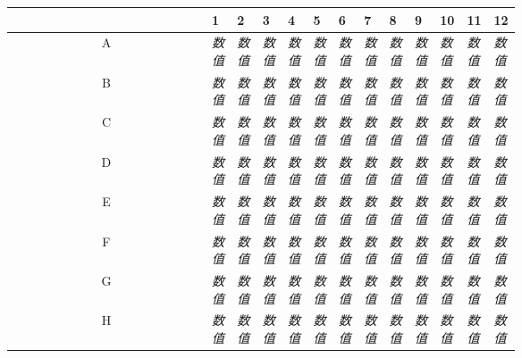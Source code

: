 \documentclass[UTF8,10pt,a4paper,fontset=fandol]{ctexart}
\begin{document}
\small
\begin{center}
\begin{tabular}{|c|*{12}{p{0.055\linewidth}|}}
\hline
 & 1 & 2 & 3 & 4 & 5 & 6 & 7 & 8 & 9 & 10 & 11 & 12\\
\hline
A &
\centering\textit{数值} &
\centering\textit{数值} &
\centering\textit{数值} &
\centering\textit{数值} &
\centering\textit{数值} &
\centering\textit{数值} &
\centering\textit{数值} &
\centering\textit{数值} &
\centering\textit{数值} &
\centering\textit{数值} &
\centering\textit{数值} &
\centering\textit{数值}\\
\hline
B &
\centering\textit{数值} &
\centering\textit{数值} &
\centering\textit{数值} &
\centering\textit{数值} &
\centering\textit{数值} &
\centering\textit{数值} &
\centering\textit{数值} &
\centering\textit{数值} &
\centering\textit{数值} &
\centering\textit{数值} &
\centering\textit{数值} &
\centering\textit{数值}\\
\hline
C &
\centering\textit{数值} &
\centering\textit{数值} &
\centering\textit{数值} &
\centering\textit{数值} &
\centering\textit{数值} &
\centering\textit{数值} &
\centering\textit{数值} &
\centering\textit{数值} &
\centering\textit{数值} &
\centering\textit{数值} &
\centering\textit{数值} &
\centering\textit{数值}\\
\hline
D &
\centering\textit{数值} &
\centering\textit{数值} &
\centering\textit{数值} &
\centering\textit{数值} &
\centering\textit{数值} &
\centering\textit{数值} &
\centering\textit{数值} &
\centering\textit{数值} &
\centering\textit{数值} &
\centering\textit{数值} &
\centering\textit{数值} &
\centering\textit{数值}\\
\hline
E &
\centering\textit{数值} &
\centering\textit{数值} &
\centering\textit{数值} &
\centering\textit{数值} &
\centering\textit{数值} &
\centering\textit{数值} &
\centering\textit{数值} &
\centering\textit{数值} &
\centering\textit{数值} &
\centering\textit{数值} &
\centering\textit{数值} &
\centering\textit{数值}\\
\hline
F &
\centering\textit{数值} &
\centering\textit{数值} &
\centering\textit{数值} &
\centering\textit{数值} &
\centering\textit{数值} &
\centering\textit{数值} &
\centering\textit{数值} &
\centering\textit{数值} &
\centering\textit{数值} &
\centering\textit{数值} &
\centering\textit{数值} &
\centering\textit{数值}\\
\hline
G &
\centering\textit{数值} &
\centering\textit{数值} &
\centering\textit{数值} &
\centering\textit{数值} &
\centering\textit{数值} &
\centering\textit{数值} &
\centering\textit{数值} &
\centering\textit{数值} &
\centering\textit{数值} &
\centering\textit{数值} &
\centering\textit{数值} &
\centering\textit{数值}\\
\hline
H &
\centering\textit{数值} &
\centering\textit{数值} &
\centering\textit{数值} &
\centering\textit{数值} &
\centering\textit{数值} &
\centering\textit{数值} &
\centering\textit{数值} &
\centering\textit{数值} &
\centering\textit{数值} &
\centering\textit{数值} &
\centering\textit{数值} &
\centering\textit{数值}\\
\hline
\end{tabular}
\end{center}
\end{document}
